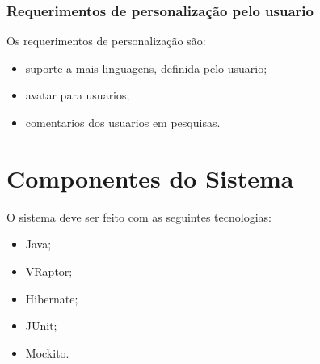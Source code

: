 \documentclass[11pt, a4paper]{article}
\begin{document}
			\subsubsection{Requerimentos de personalização pelo usuario}
				\noindent Os requerimentos de personalização são:
				\begin{itemize}
					\item suporte a mais linguagens, definida pelo usuario;
					\item avatar para usuarios;
					\item comentarios dos usuarios em pesquisas.
				\end{itemize}
				
    \section{Componentes do Sistema}
		\noindent O sistema deve ser feito com as seguintes tecnologias:
		\begin{itemize}
			\item Java;
			\item VRaptor;
			\item Hibernate;
			\item JUnit;
			\item Mockito.
		\end{itemize}
    
\end{document}
